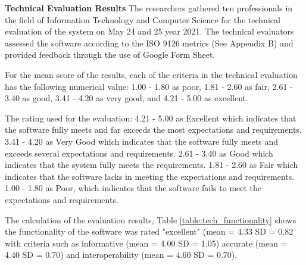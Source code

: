 \textbf{Technical Evaluation Results}
\justifying
\parx
The researchers gathered ten professionals in the field of Information
Technology and Computer Science for the technical evaluation of the system on
May 24 and 25 year 2021. The technical evaluators assessed the software
according to the ISO 9126 metrics (See Appendix B) and provided feedback
through the use of Google Form Sheet.

\parx
For the mean score of the results, each of the criteria in the technical
evaluation has the following numerical value: 1.00 - 1.80 as poor, 1.81 - 2.60 as fair, 2.61 - 3.40 as good,
3.41 - 4.20 as very good, and 4.21 - 5.00 as excellent.

\parx
The rating used for the evaluation: 4.21 - 5.00 as Excellent which indicates that the
software fully meets and far exceeds the most expectations and requirements.
3.41 - 4.20 as Very Good which indicates that the software fully meets and exceeds
several expectations and requirements. 2.61 - 3.40 as Good which indicates that the
system fully meets the requirements. 1.81 - 2.60 as Fair which indicates that the software
lacks in meeting the expectations and requirements. 1.00 - 1.80 as Poor, which
indicates that the software fails to meet the expectations and requirements.

\parx
The calculation of the evaluation results, Table \ref{table:tech_functionality} shows the
functionality of the software was rated "excellent" (mean = 4.33 SD = 0.82 with criteria
such as informative (mean = 4.00 SD = 1.05) accurate (mean = 4.40 SD = 0.70)
and interoperability (mean = 4.60 SD = 0.70).

